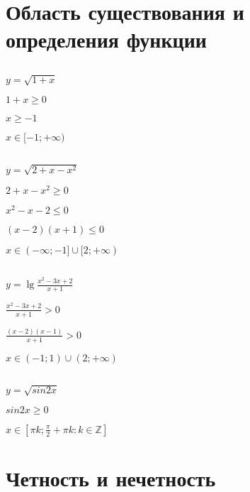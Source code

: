 \documentclass{article}
\begin{document}
\section{Область существования и определения функции}

\subsection{}

$y = \sqrt{1 + x}$

$1 + x \ge 0$

$x \ge -1$

$x \in [-1; +\infty)$

\subsection{}

$y = \sqrt{2 + x - x^2}$

$2 + x - x^2 \ge 0$

$x^2 - x - 2 \le 0$

$(x - 2)(x + 1) \le 0$

$x \in (-\infty; -1] \cup [2; +\infty)$

\subsection{}

$y = \lg{\frac{x^2 - 3x + 2}{x + 1}}$

$\frac{x^2 - 3x + 2}{x + 1} > 0$

$\frac{(x - 2)(x - 1)}{x + 1} > 0$

$x \in (-1; 1) \cup (2; +\infty)$

\subsection{}

$y = \sqrt{sin2x}$

$sin2x \ge 0$

$x \in [\pi k; \frac{\pi}{2} + \pi k: k \in \mathbb{Z}]$

\section{Четность и нечетность}

\subsection{}
\end{document}
